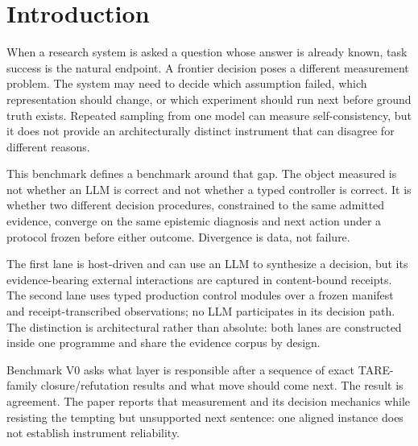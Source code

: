 \section{Introduction}

When a research system is asked a question whose answer is already known, task success is the natural endpoint. A frontier decision poses a different measurement problem. The system may need to decide which assumption failed, which representation should change, or which experiment should run next before ground truth exists. Repeated sampling from one model can measure self-consistency, but it does not provide an architecturally distinct instrument that can disagree for different reasons.

This benchmark defines a benchmark around that gap. The object measured is not whether an LLM is correct and not whether a typed controller is correct. It is whether two different decision procedures, constrained to the same admitted evidence, converge on the same epistemic diagnosis and next action under a protocol frozen before either outcome. Divergence is data, not failure.

The first lane is host-driven and can use an LLM to synthesize a decision, but its evidence-bearing external interactions are captured in content-bound receipts. The second lane uses typed production control modules over a frozen manifest and receipt-transcribed observations; no LLM participates in its decision path. The distinction is architectural rather than absolute: both lanes are constructed inside one programme and share the evidence corpus by design.

Benchmark V0 asks what layer is responsible after a sequence of exact TARE-family closure/refutation results and what move should come next. The result is agreement. The paper reports that measurement and its decision mechanics while resisting the tempting but unsupported next sentence: one aligned instance does not establish instrument reliability.